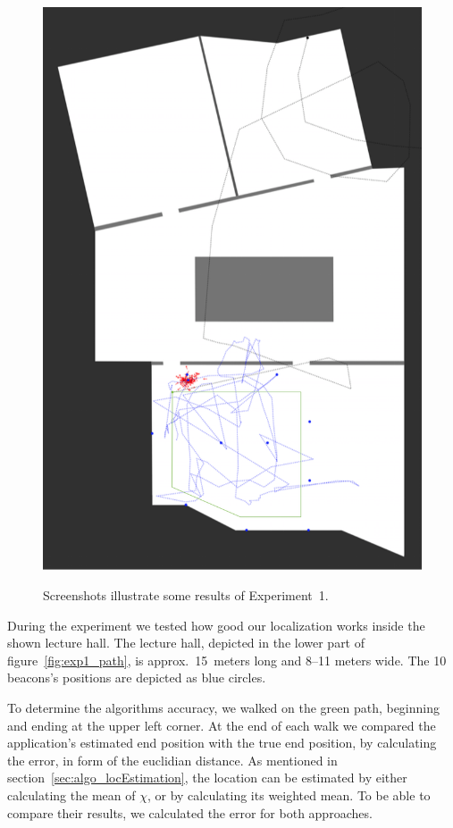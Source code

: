 \begin{figure}
{		\includegraphics[height=0.45\textheight]{figures/eval_1_3}
		\label{fig:exp1_img_3}
	}
	\caption{Screenshots illustrate some results of Experiment~1.}
	\label{fig:exp1_screenshot}
\end{figure}

During the experiment we tested how good our localization works inside the shown lecture hall. The lecture hall, depicted in the lower part of figure~\ref{fig:exp1_path}, is approx.\ 15~meters long and 8–11 meters wide. The 10 beacons's positions are depicted as blue circles.

To determine the algorithms accuracy, we walked on the green path, beginning and ending at the upper left corner. At the end of each walk we compared the application's estimated end position with the true end position, by calculating the error, in form of the euclidian distance. As mentioned in section~\ref{sec:algo_locEstimation}, the location can be estimated by either calculating the mean of $\chi$, or by calculating its weighted mean. To be able to compare their results, we calculated the error for both approaches.

